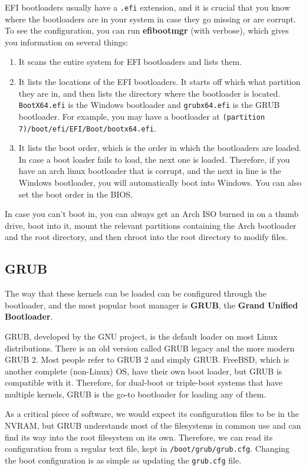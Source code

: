\documentclass{article}
\theoremstyle{definition}
\begin{document}
  EFI bootloaders usually have a \texttt{.efi} extension, and it is crucial that you know where the bootloaders are in your system in case they go missing or are corrupt. To see the configuration, you can run \textbf{efibootmgr} (with verbose), which gives you information on several things: 
  \begin{enumerate} 
    \item It scans the entire system for EFI bootloaders and lists them. 
    \item It lists the locations of the EFI bootloaders. It starts off which what partition they are in, and then lists the directory where the bootloader is located. \texttt{BootX64.efi} is the Windows bootloader and \texttt{grubx64.efi} is the GRUB bootloader. For example, you may have a bootloader at \texttt{(partition 7)/boot/efi/EFI/Boot/bootx64.efi}. 
    \item It lists the boot order, which is the order in which the bootloaders are loaded. In case a boot loader fails to load, the next one is loaded. Therefore, if you have an arch linux bootloader that is corrupt, and the next in line is the Windows bootloader, you will automatically boot into Windows. You can also set the boot order in the BIOS. 
  \end{enumerate}

  In case you can't boot in, you can always get an Arch ISO burned in on a thumb drive, boot into it, mount the relevant partitions containing the Arch bootloader and the root directory, and then chroot into the root directory to modify files. 

  \subsection{GRUB}

    The way that these kernels can be loaded can be configured through the bootloader, and the most popular boot manager is \textbf{GRUB}, the \textbf{Grand Unified Bootloader}. 

    GRUB, developed by the GNU project, is the default loader on most Linux distributions. There is an old version called GRUB legacy and the more modern GRUB 2. Most people refer to GRUB 2 and simply GRUB. FreeBSD, which is another complete (non-Linux) OS, have their own boot loader, but GRUB is compatible with it. Therefore, for dual-boot or triple-boot systems that have multiple kernels, GRUB is the go-to bootloader for loading any of them. 

    As a critical piece of software, we would expect its configuration files to be in the NVRAM, but GRUB understands most of the filesystems in common use and can find its way into the root filesystem on its own. Therefore, we can read its configuration from a regular text file, kept in \texttt{/boot/grub/grub.cfg}. Changing the boot configuration is as simple as updating the \texttt{grub.cfg} file. 
\end{document}
